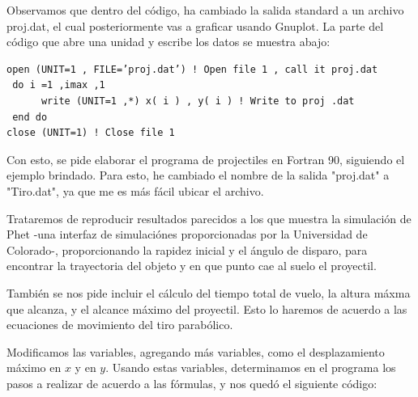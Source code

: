 \documentclass[12pt]{article}
\begin{document}
Observamos que dentro del código, ha cambiado la salida standard a un archivo proj.dat, el cual posteriormente vas a graficar usando Gnuplot.  La parte del código que abre una unidad y escribe los datos se muestra abajo:

\begin{verbatim}
open (UNIT=1 , FILE=’proj.dat’) ! Open file 1 , call it proj.dat
 do i =1 ,imax ,1
      write (UNIT=1 ,*) x( i ) , y( i ) ! Write to proj .dat
 end do
close (UNIT=1) ! Close file 1 
\end{verbatim}

Con esto, se pide elaborar el programa de projectiles en Fortran 90, siguiendo el ejemplo brindado. Para esto, he cambiado el nombre de la salida "proj.dat" a "Tiro.dat", ya que me es más fácil ubicar el archivo.

Trataremos de reproducir resultados parecidos a los que muestra la simulación de Phet -una interfaz de simulaciónes proporcionadas por la Universidad de Colorado-, proporcionando la rapidez inicial y el ángulo de disparo, para encontrar la trayectoria del objeto y en que punto cae al suelo el proyectil.

También se nos pide incluir el cálculo del tiempo total de vuelo, la altura máxma que alcanza, y el alcance máximo del proyectil. Esto lo haremos de acuerdo a las ecuaciones de movimiento del tiro parabólico.

Modificamos las variables, agregando más variables, como el desplazamiento máximo en $x$ y en $y$. Usando estas variables, determinamos en el programa los pasos a realizar de acuerdo a las fórmulas, y nos quedó el siguiente código:
\end{document}
